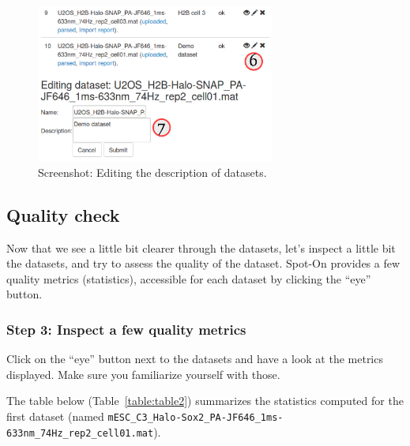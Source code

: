 \begin{figure}[h]
\centering
\includegraphics[width=0.7\textwidth]{../SPTGUI/static/SPTGUI/img/tutorial/0.7/tuto3.png}
\caption{\label{fig:tuto3}Screenshot: Editing the description of datasets.}
\end{figure}


\subsection{Quality check}
Now that we see a little bit clearer through the datasets, let's inspect a little bit the datasets, and try to assess the quality of the dataset. Spot-On provides a few quality metrics (statistics), accessible for each dataset by clicking the ``eye'' button.

\subsubsection{Step 3: Inspect a few quality metrics}
Click on the ``eye'' button next to the datasets and have a look at the metrics displayed. Make sure you familiarize yourself with those.

The table below (Table~\ref{table:table2}) summarizes the statistics computed for the first dataset (named \texttt{mESC\_C3\_Halo-Sox2\_PA-JF646\_1ms-633nm\_74Hz\_rep2\_cell01.mat}).

